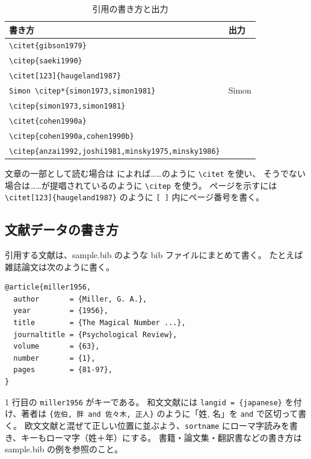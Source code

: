 \documentclass[paper]{bunkajoho}
\begin{document}
\begin{table}[tb]
  \centering
  \caption{引用の書き方と出力}
  \label{tab:cite}
  \footnotesize
  \begin{tabular}{ll}
    \toprule
    書き方 & 出力 \\
    \midrule
    \verb|\citet{gibson1979}| & \citet{gibson1979} \\
    \verb|\citep{saeki1990}| & \citep{saeki1990} \\
    \verb|\citet[123]{haugeland1987}| & \citet[123]{haugeland1987} \\
    \verb|Simon \citep*{simon1973,simon1981}| & Simon \citep*{simon1973,simon1981} \\
    \verb|\citep{simon1973,simon1981}| & \citep{simon1973,simon1981} \\
    \verb|\citet{cohen1990a}| & \citet{cohen1990a} \\
    \verb|\citep{cohen1990a,cohen1990b}| & \citep{cohen1990a,cohen1990b} \\
    \verb|\citep{anzai1992,joshi1981,minsky1975,minsky1986}| & \citep{anzai1992,joshi1981,minsky1975,minsky1986} \\
    \bottomrule
  \end{tabular}
\end{table}

文章の一部として読む場合は \citet{gibson1979} によれば\ldots\ldots のように \verb|\citet| を使い、
そうでない場合は\ldots\ldots が提唱されている\citep{saeki1990}のように \verb|\citep| を使う。
ページを示すには \verb|\citet[123]{haugeland1987}| のように \verb|[ ]| 内にページ番号を書く。

\subsection{文献データの書き方}

引用する文献は、sample.bib のような bib ファイルにまとめて書く。
たとえば雑誌論文は次のように書く。

\begin{small}
\begin{verbatim}
@article{miller1956,
  author       = {Miller, G. A.},
  year         = {1956},
  title        = {The Magical Number ...},
  journaltitle = {Psychological Review},
  volume       = {63},
  number       = {1},
  pages        = {81-97},
}
\end{verbatim}
\end{small}

1 行目の \verb|miller1956| がキーである。
和文文献には \verb|langid = {japanese}| を付け、著者は \verb|{佐伯, 胖 and 佐々木, 正人}| のように「姓, 名」を \verb|and| で区切って書く。
欧文文献と混ぜて正しい位置に並ぶよう、\verb|sortname| にローマ字読みを書き、キーもローマ字（姓＋年）にする。
書籍・論文集・翻訳書などの書き方は sample.bib の例を参照のこと。
\end{document}
